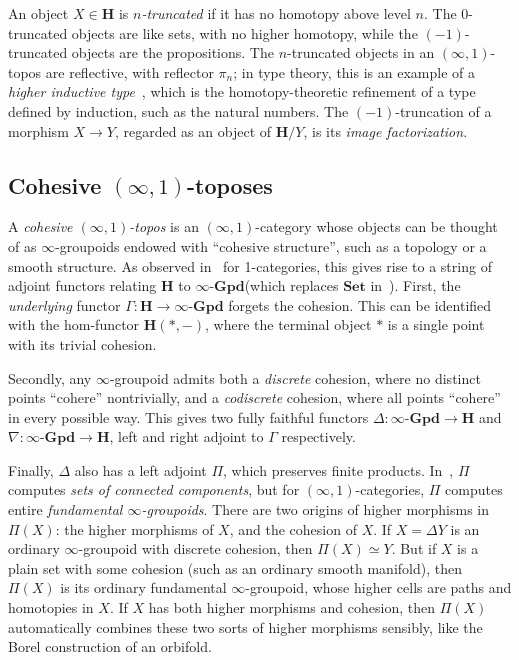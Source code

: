 \documentclass[copyright]{eptcs}
\newcommand{\ig}{\ensuremath{\infty\text{-}\mathbf{Gpd}}\xspace}
\renewcommand{\H}{\ensuremath{\mathbf{H}}\xspace}
\newcommand{\io}{\ensuremath{(\infty,1)}}
\begin{document}
An object $X\in\H$ is \emph{$n$-truncated} if it has no homotopy above level $n$.
The $0$-truncated objects are like sets, with no higher homotopy, while the $(-1)$-truncated objects are the propositions.
The $n$-truncated objects in an \io-topos are reflective, with reflector $\pi_n$; in type theory, this is
an example of
a \emph{higher inductive type}~\cite{ShulmanLumsdaine,hottbook},%
which is the homotopy-theoretic refinement of a type defined by induction, such as the natural numbers.
The $(-1)$-truncation of a morphism $X\to Y$, regarded as an object of $\H/Y$, is its \emph{image factorization}.


\subsection{Cohesive \io-toposes}
\label{sec:cohesion}

A \emph{cohesive \io-topos} is an \io-category whose objects can be thought of as $\infty$-groupoids
endowed with ``cohesive structure'', such as a topology or a smooth structure.
As observed in~\cite{Lawvere} for 1-categories, this gives rise to a string of adjoint functors relating $\H$ to \ig (which replaces $\mathbf{Set}$ in~\cite{Lawvere}).
First, the \emph{underlying} functor $\Gamma:\H\to\ig$ forgets the cohesion.
This can be identified with the hom-functor $\H(*,-)$, where the terminal object $*$ is a single point with its trivial cohesion.

Secondly, any $\infty$-groupoid admits both a \emph{discrete} cohesion, where no distinct points ``cohere'' nontrivially, and a \emph{codiscrete} cohesion, where all points ``cohere'' in every possible way.
This gives two fully faithful functors $\Delta: \ig\to\H$ and $\nabla:\ig\to\H$, left and right adjoint to $\Gamma$ respectively.

Finally, $\Delta$ also has a left adjoint $\Pi$, which preserves finite products.
In~\cite{Lawvere}, $\Pi$ computes \emph{sets of connected components}, but for \io-categories, $\Pi$ computes entire \emph{fundamental $\infty$-groupoids}.
There are two origins of higher morphisms in $\Pi(X)$: the higher morphisms of $X$, and the cohesion of $X$.
If $X=\Delta Y$ is an ordinary $\infty$-groupoid with discrete cohesion, then $\Pi(X) \simeq Y$.
But if $X$ is a plain set with some cohesion (such as an ordinary smooth manifold), then $\Pi(X)$ is its ordinary fundamental $\infty$-groupoid, whose higher cells are paths and homotopies in $X$.
If $X$ has both higher morphisms and cohesion, then $\Pi(X)$ automatically combines these two sorts of higher morphisms sensibly, like the Borel construction of an orbifold.
\end{document}

